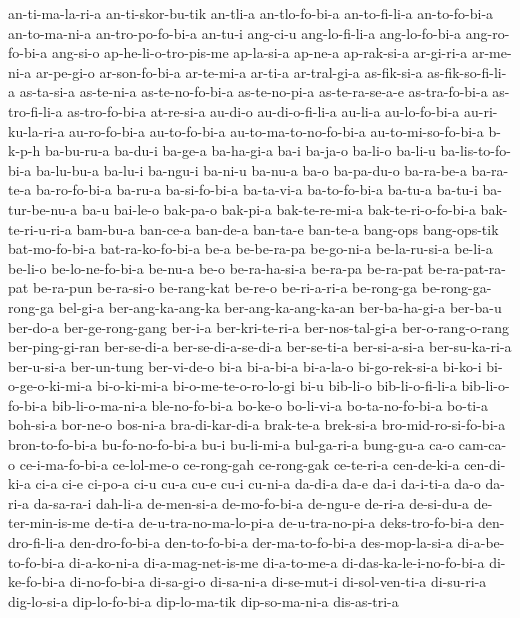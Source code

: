 {an-ti-ma-la-ri-a an-ti-skor-bu-tik an-tli-a an-tlo-fo-bi-a an-to-fi-li-a
an-to-fo-bi-a an-to-ma-ni-a an-tro-po-fo-bi-a an-tu-i ang-ci-u
ang-lo-fi-li-a ang-lo-fo-bi-a ang-ro-fo-bi-a ang-si-o
ap-he-li-o-tro-pis-me ap-la-si-a ap-ne-a ap-rak-si-a ar-gi-ri-a ar-me-ni-a
ar-pe-gi-o ar-son-fo-bi-a ar-te-mi-a ar-ti-a ar-tral-gi-a as-fik-si-a
as-fik-so-fi-li-a as-ta-si-a as-te-ni-a as-te-no-fo-bi-a as-te-no-pi-a
as-te-ra-se-a-e as-tra-fo-bi-a as-tro-fi-li-a as-tro-fo-bi-a at-re-si-a
au-di-o au-di-o-fi-li-a au-li-a au-lo-fo-bi-a au-ri-ku-la-ri-a
au-ro-fo-bi-a au-to-fo-bi-a au-to-ma-to-no-fo-bi-a au-to-mi-so-fo-bi-a
b-k-p-h ba-bu-ru-a ba-du-i ba-ge-a ba-ha-gi-a ba-i ba-ja-o ba-li-o ba-li-u
ba-lis-to-fo-bi-a ba-lu-bu-a ba-lu-i ba-ngu-i ba-ni-u ba-nu-a ba-o
ba-pa-du-o ba-ra-be-a ba-ra-te-a ba-ro-fo-bi-a ba-ru-a ba-si-fo-bi-a
ba-ta-vi-a ba-to-fo-bi-a ba-tu-a ba-tu-i ba-tur-be-nu-a ba-u bai-le-o
bak-pa-o bak-pi-a bak-te-re-mi-a bak-te-ri-o-fo-bi-a bak-te-ri-u-ri-a
bam-bu-a ban-ce-a ban-de-a ban-ta-e ban-te-a bang-ops bang-ops-tik
bat-mo-fo-bi-a bat-ra-ko-fo-bi-a be-a be-be-ra-pa be-go-ni-a be-la-ru-si-a
be-li-a be-li-o be-lo-ne-fo-bi-a be-nu-a be-o be-ra-ha-si-a be-ra-pa
be-ra-pat be-ra-pat-ra-pat be-ra-pun be-ra-si-o be-rang-kat be-re-o
be-ri-a-ri-a be-rong-ga be-rong-ga-rong-ga bel-gi-a ber-ang-ka-ang-ka
ber-ang-ka-ang-ka-an ber-ba-ha-gi-a ber-ba-u ber-do-a ber-ge-rong-gang
ber-i-a ber-kri-te-ri-a ber-nos-tal-gi-a ber-o-rang-o-rang ber-ping-gi-ran
ber-se-di-a ber-se-di-a-se-di-a ber-se-ti-a ber-si-a-si-a ber-su-ka-ri-a
ber-u-si-a ber-un-tung ber-vi-de-o bi-a bi-a-bi-a bi-a-la-o bi-go-rek-si-a
bi-ko-i bi-o-ge-o-ki-mi-a bi-o-ki-mi-a bi-o-me-te-o-ro-lo-gi bi-u bib-li-o
bib-li-o-fi-li-a bib-li-o-fo-bi-a bib-li-o-ma-ni-a ble-no-fo-bi-a bo-ke-o
bo-li-vi-a bo-ta-no-fo-bi-a bo-ti-a boh-si-a bor-ne-o bos-ni-a
bra-di-kar-di-a brak-te-a brek-si-a bro-mid-ro-si-fo-bi-a bron-to-fo-bi-a
bu-fo-no-fo-bi-a bu-i bu-li-mi-a bul-ga-ri-a bung-gu-a ca-o cam-ca-o
ce-i-ma-fo-bi-a ce-lol-me-o ce-rong-gah ce-rong-gak ce-te-ri-a cen-de-ki-a
cen-di-ki-a ci-a ci-e ci-po-a ci-u cu-a cu-e cu-i cu-ni-a da-di-a da-e
da-i da-i-ti-a da-o da-ri-a da-sa-ra-i dah-li-a de-men-si-a de-mo-fo-bi-a
de-ngu-e de-ri-a de-si-du-a de-ter-min-is-me de-ti-a
de-u-tra-no-ma-lo-pi-a de-u-tra-no-pi-a deks-tro-fo-bi-a den-dro-fi-li-a
den-dro-fo-bi-a den-to-fo-bi-a der-ma-to-fo-bi-a des-mop-la-si-a
di-a-be-to-fo-bi-a di-a-ko-ni-a di-a-mag-net-is-me di-a-to-me-a
di-das-ka-le-i-no-fo-bi-a di-ke-fo-bi-a di-no-fo-bi-a di-sa-gi-o
di-sa-ni-a di-se-mut-i di-sol-ven-ti-a di-su-ri-a dig-lo-si-a
dip-lo-fo-bi-a dip-lo-ma-tik dip-so-ma-ni-a dis-as-tri-a
}
